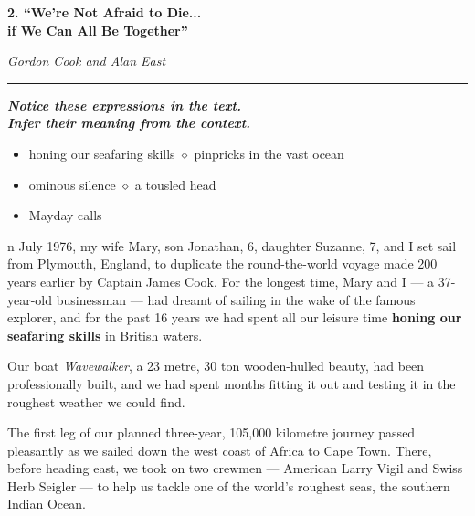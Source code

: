\documentclass[11pt,a4paper]{article}
\begin{document}
\begin{flushleft}
    {\Huge \textbf{\color{chapterpink} 2. ``We're Not Afraid to Die...}} \\[0.3em]
    {\Huge \textbf{\color{chapterpink} \hspace*{1.2cm} if We Can All Be Together''}}
\end{flushleft}

\vspace{1em}

\begin{flushright}
    {\large \textit{Gordon Cook and Alan East}} \\
    \rule[0.5ex]{4cm}{0.5pt}
\end{flushright}

\vspace{2em}

\noindent \textit{\textbf{Notice these expressions in the text. \\ Infer their meaning from the context.}}

\vspace{1em}

\begin{itemize}[label=$\diamond$, itemsep=0.2em]
    \item honing our seafaring skills \hfill $\diamond$ pinpricks in the vast ocean \hspace*{2cm}
    \item ominous silence \hfill $\diamond$ a tousled head \hspace*{2cm}
    \item Mayday calls \hfill \null
\end{itemize}

\vspace{2em}

n July 1976, my wife Mary, son Jonathan, 6, daughter Suzanne, 7, and I set sail from Plymouth, England, to duplicate the round-the-world voyage made 200 years earlier by Captain James Cook. For the longest time, Mary and I --- a 37-year-old businessman --- had dreamt of sailing in the wake of the famous explorer, and for the past 16 years we had spent all our leisure time \textbf{honing our seafaring skills} in British waters.

\vspace{1em}

Our boat \textit{Wavewalker}, a 23 metre, 30 ton wooden-hulled beauty, had been professionally built, and we had spent months fitting it out and testing it in the roughest weather we could find.

\vspace{1em}

The first leg of our planned three-year, 105,000 kilometre journey passed pleasantly as we sailed down the west coast of Africa to Cape Town. There, before heading east, we took on two crewmen --- American Larry Vigil and Swiss Herb Seigler --- to help us tackle one of the world's roughest seas, the southern Indian Ocean.
\end{document}
